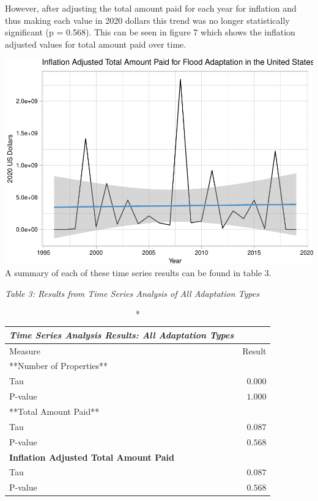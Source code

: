 \documentclass[
  12pt,
]{article}
\begin{document}
However, after adjusting the total amount paid for each year for
inflation and thus making each value in 2020 dollars this trend was no
longer statistically significant (p = 0.568). This can be seen in figure
7 which shows the inflation adjusted values for total amount paid over
time.

\includegraphics{finalreport_files/figure-latex/unnamed-chunk-12-1.pdf}
\newpage A summary of each of these time series results can be found in
table 3.

\emph{Table 3: Results from Time Series Analysis of All Adaptation
Types}\\
\captionsetup[table]{labelformat=empty,skip=1pt}

\begin{longtable}{lr}
\caption*{
{\large \emph{\textbf{Time Series Analysis Results: All Adaptation Types}}}
} \\ 
\toprule
Measure & Result \\ 
\midrule
\multicolumn{1}{l}{**Number of Properties**} \\ 
\midrule
Tau & $0.000$ \\ 
P-value & $1.000$ \\ 
\midrule
\multicolumn{1}{l}{**Total Amount Paid**} \\ 
\midrule
Tau & $0.087$ \\ 
P-value & $0.568$ \\ 
\midrule
\multicolumn{1}{l}{\textbf{Inflation Adjusted Total Amount Paid}} \\ 
\midrule
Tau & $0.087$ \\ 
P-value & $0.568$ \\ 
\bottomrule
\end{longtable}
\end{document}
